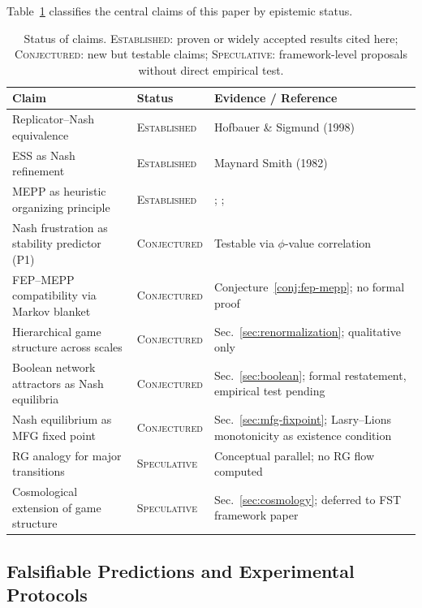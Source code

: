\documentclass[12pt,a4paper]{article}
\theoremstyle{remark}
\begin{document}
Table~\ref{tab:status-claims} classifies the central claims of this paper by epistemic status.

\begin{table}[htbp]
\centering
\caption{Status of claims. \textsc{Established}: proven or widely accepted results cited here; \textsc{Conjectured}: new but testable claims; \textsc{Speculative}: framework-level proposals without direct empirical test.}
\label{tab:status-claims}
\small
\begin{tabular}{p{4.8cm}lp{5.2cm}}
\toprule
\textbf{Claim} & \textbf{Status} & \textbf{Evidence / Reference} \\
\midrule
Replicator--Nash equivalence & \textsc{Established} & Hofbauer \& Sigmund (1998) \\
ESS as Nash refinement & \textsc{Established} & Maynard Smith (1982) \\
MEPP as heuristic organizing principle & \textsc{Established} & \citet{Martyushev2010}; \citet{Toma2025}; \citet{EcosystemMEPP} \\
Nash frustration as stability predictor (P1) & \textsc{Conjectured} & Testable via $\phi$-value correlation \\
FEP--MEPP compatibility via Markov blanket & \textsc{Conjectured} & Conjecture~\ref{conj:fep-mepp}; no formal proof \\
Hierarchical game structure across scales & \textsc{Conjectured} & Sec.~\ref{sec:renormalization}; qualitative only \\
Boolean network attractors as Nash equilibria & \textsc{Conjectured} & Sec.~\ref{sec:boolean}; formal restatement, empirical test pending \\
Nash equilibrium as MFG fixed point & \textsc{Conjectured} & Sec.~\ref{sec:mfg-fixpoint}; Lasry--Lions monotonicity as existence condition \\
RG analogy for major transitions & \textsc{Speculative} & Conceptual parallel; no RG flow computed \\
Cosmological extension of game structure & \textsc{Speculative} & Sec.~\ref{sec:cosmology}; deferred to FST framework paper \\
\bottomrule
\end{tabular}
\end{table}

\subsection{Falsifiable Predictions and Experimental Protocols}
\label{sec:falsifiable-predictions}
\end{document}
